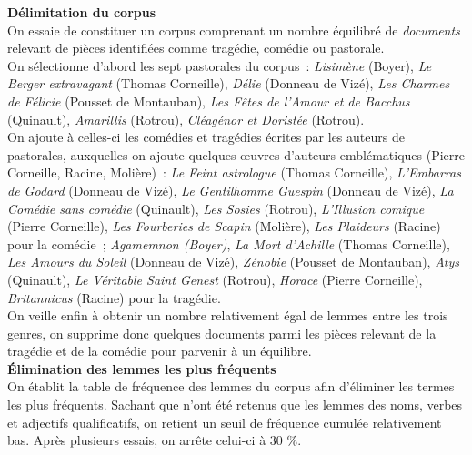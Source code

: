 \documentclass[a4paper,twoside,12pt]{article}
\begin{document}
\textbf{Délimitation du corpus}\\
On essaie de constituer un corpus comprenant un nombre équilibré de \textit{documents} relevant de pièces identifiées comme tragédie, comédie ou pastorale.\\
On sélectionne d'abord les sept pastorales du corpus\ : \textit{Lisimène} (Boyer), \textit{Le Berger extravagant} (Thomas Corneille), \textit{Délie} (Donneau de Vizé), \textit{Les Charmes de Félicie} (Pousset de Montauban), \textit{Les Fêtes de l'Amour et de Bacchus} (Quinault), \textit{Amarillis} (Rotrou), \textit{Cléagénor et Doristée} (Rotrou).\\
On ajoute à celles-ci les comédies et tragédies écrites par les auteurs de pastorales, auxquelles on ajoute quelques œuvres d'auteurs emblématiques (Pierre Corneille, Racine, Molière)\ : \textit{Le Feint astrologue} (Thomas Corneille), \textit{L'Embarras de Godard} (Donneau de Vizé), \textit{Le Gentilhomme Guespin} (Donneau de Vizé), \textit{La Comédie sans comédie} (Quinault), \textit{Les Sosies} (Rotrou), \textit{L'Illusion comique} (Pierre Corneille), \textit{Les Fourberies de Scapin} (Molière), \textit{Les Plaideurs} (Racine) pour la comédie\ ; \textit{Agamemnon (Boyer)}, \textit{La Mort d'Achille} (Thomas Corneille), \textit{Les Amours du Soleil} (Donneau de Vizé), \textit{Zénobie} (Pousset de Montauban), \textit{Atys} (Quinault), \textit{Le Véritable Saint Genest} (Rotrou), \textit{Horace} (Pierre Corneille), \textit{Britannicus} (Racine) pour la tragédie.\\
On veille enfin à obtenir un nombre relativement égal de lemmes entre les trois genres, on supprime donc quelques documents parmi les pièces relevant de la tragédie et de la comédie pour parvenir à un équilibre.\\

\textbf{Élimination des lemmes les plus fréquents}\\
On établit la table de fréquence des lemmes du corpus afin d'éliminer les termes les plus fréquents. Sachant que n'ont été retenus que les lemmes des noms, verbes et adjectifs qualificatifs, on retient un seuil de fréquence cumulée relativement bas. Après plusieurs essais, on arrête celui-ci à 30 \%.\\
\end{document}
